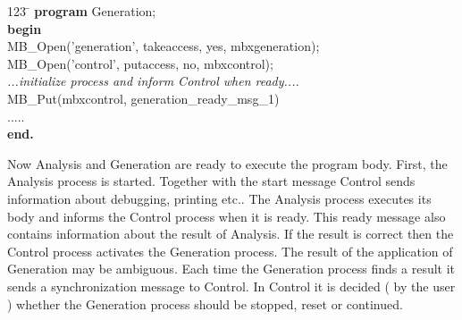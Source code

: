 \begin{tabbing}
123 \= \kill
{\bf program} Generation; \\
{\bf begin} \\
\> MB\_Open('generation', takeaccess, yes, mbxgeneration); \\
\> MB\_Open('control', putaccess, no, mbxcontrol); \\
\> {\em ...initialize process and inform Control when ready....} \\
\> MB\_Put(mbxcontrol, generation\_ready\_msg\_1) \\
\> ..... \\
{\bf end.}
\end{tabbing}
Now Analysis and Generation are ready to execute the program body. First, the
Analysis process is started. Together with the start message Control sends 
information about debugging, printing etc.. The Analysis process executes its body
and informs the Control process when it is ready. This ready message also 
contains information about the result of Analysis. If the result is correct 
then the Control process activates the Generation process. The result of the
application of Generation may be ambiguous. Each time the Generation process 
finds a result it sends a synchronization message to Control. In Control it
is decided ( by the user )
whether the Generation process should be stopped, reset or continued.

